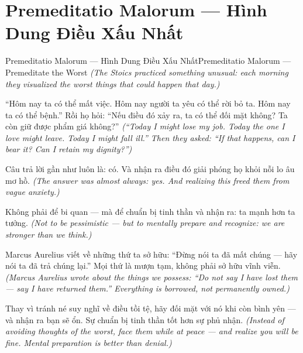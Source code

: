 \section{Premeditatio Malorum — Hình Dung Điều Xấu Nhất}
\begin{truyen}{Premeditatio Malorum — Hình Dung Điều Xấu Nhất}{Premeditatio Malorum — Premeditate the Worst}
\textit{(The Stoics practiced something unusual: each morning they visualized the worst things that could happen that day.)}

``Hôm nay ta có thể mất việc. Hôm nay người ta yêu có thể rời bỏ ta. Hôm nay ta có thể bệnh.'' Rồi họ hỏi: ``Nếu điều đó xảy ra, ta có thể đối mặt không? Ta còn giữ được phẩm giá không?''
\textit{(``Today I might lose my job. Today the one I love might leave. Today I might fall ill.'' Then they asked: ``If that happens, can I bear it? Can I retain my dignity?'')}

Câu trả lời gần như luôn là: có. Và nhận ra điều đó giải phóng họ khỏi nỗi lo âu mơ hồ.
\textit{(The answer was almost always: yes. And realizing this freed them from vague anxiety.)}

Không phải để bi quan — mà để chuẩn bị tinh thần và nhận ra: ta mạnh hơn ta tưởng.
\textit{(Not to be pessimistic — but to mentally prepare and recognize: we are stronger than we think.)}

Marcus Aurelius viết về những thứ ta sở hữu: ``Đừng nói ta đã mất chúng — hãy nói ta đã trả chúng lại.'' Mọi thứ là mượn tạm, không phải sở hữu vĩnh viễn.
\textit{(Marcus Aurelius wrote about the things we possess: ``Do not say I have lost them — say I have returned them.'' Everything is borrowed, not permanently owned.)}

\end{truyen}

\begin{baihoc}
Thay vì tránh né suy nghĩ về điều tồi tệ, hãy đối mặt với nó khi còn bình yên — và nhận ra bạn sẽ ổn. Sự chuẩn bị tinh thần tốt hơn sự phủ nhận.
\textit{(Instead of avoiding thoughts of the worst, face them while at peace — and realize you will be fine. Mental preparation is better than denial.)}
\end{baihoc}
\ngancach


